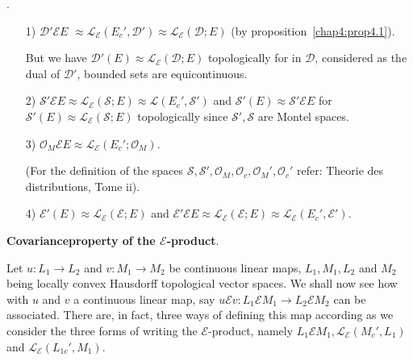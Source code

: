 .

\begin{itemize}
\item [1)] $\mathscr{D}' \mathcal{E} E$ $\approx
  \mathscr{L}_\mathcal{E}(E_c', \mathscr{D}') \approx
  \mathscr{L}_\mathcal{E}(\mathscr{D}; E)$ \hfill (by 
proposition~\ref{chap4:prop4.1}).

But we have $\mathscr{D}'(E) \approx
\mathscr{L}_\mathcal{E}(\mathscr{D}; E)$ topologically for in
$\mathscr{D}$, considered as the dual of $\mathscr{D}'$, bounded sets
are equicontinuous. 
\item [2)] $\mathscr{S}' \mathcal{E} E \approx
  \mathscr{L}_\mathcal{E}(\mathscr{S}; E) \approx \mathscr{L}(E_c',
  \mathscr{S}')$ and $\mathscr{S}'(E)\approx \mathscr{S}' \mathcal{E}
  E$ for $\mathscr{S}'(E) \approx \mathscr{L}_\mathcal{E}(\mathscr{S};
  E)$ topologically since $\mathscr{S}', \mathscr{S}$ are Montel\break
  spaces.
\item [3)] $\mathscr{O}_M \mathcal{E} E \approx
  \mathscr{L}_\mathcal{E} (E_c'; \mathscr{O}_M)$. 

\noindent (For the definition of the spaces $\mathscr{S},
\mathscr{S}', \mathscr{O}_M, \mathscr{O}_c, \mathscr{O}_M',
\mathscr{O}_c'$ refer: Theorie des distributions, Tome ii).
\item [4)] $\mathscr{E}'(E) \approx
  \mathscr{L}_\mathcal{E}(\mathscr{E};E)$ and $\mathscr{E}'
  \mathcal{E} E \approx \mathscr{L}_\mathcal{E}(\mathscr{E}; E)
  \approx \mathscr{L}_\mathcal{E}(E_c', \mathscr{E}')$. 
\end{itemize}

\noindent 
{\bf Covariance\pageoriginale property of the $\mathcal{E}$-product}.

Let $u : L_1 \to L_2$ and $v : M_1 \to M_2$ be continuous linear maps,
$L_1, M_1, L_2$ and $M_2$ being locally convex Hausdorff topological
vector spaces. We shall now see how with $u$ and $v$ a continuous
linear map, say $u \mathcal{E} v : L_1 \mathcal{E} M_1 \to L_2
\mathcal{E} M_2$ can be associated. There are, in fact, three ways of
defining this map according as we consider the three forms of writing
the $\mathcal{E}$-product, namely $L_1 \mathcal{E} M_1,
\mathscr{L}_\mathcal{E} (M_c', L_1)$ and
$\mathscr{L}_\mathcal{E}(L_{1c}', M_1)$.

